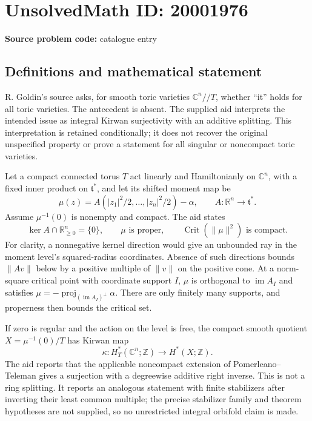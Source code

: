 \documentclass[11pt]{article}
\newcommand{\Z}{\mathbb{Z}}
\newcommand{\R}{\mathbb{R}}
\newcommand{\C}{\mathbb{C}}
\begin{document}
\section*{UnsolvedMath ID: 20001976}
\textbf{Source problem code:} catalogue entry
\subsection{Definitions and mathematical statement}
R. Goldin's source asks, for smooth toric varieties \(\C^n//T\), whether ``it'' holds for all toric varieties. The antecedent is absent. The supplied aid interprets the intended issue as integral Kirwan surjectivity with an additive splitting. This interpretation is retained conditionally; it does not recover the original unspecified property or prove a statement for all singular or noncompact toric varieties.

Let a compact connected torus \(T\) act linearly and Hamiltonianly on \(\C^n\), with a fixed inner product on \(\mathfrak t^*\), and let its shifted moment map be
\[
 \mu(z)=A(|z_1|^2/2,\ldots,|z_n|^2/2)-\alpha,
 \qquad A:\R^n\to\mathfrak t^*.
\]
Assume \(\mu^{-1}(0)\) is nonempty and compact. The aid states
\[
 \ker A\cap\R_{\geq0}^n=\{0\},\qquad
 \mu\text{ is proper},\qquad
 \operatorname{Crit}(\|\mu\|^2)\text{ is compact}.
\]
For clarity, a nonnegative kernel direction would give an unbounded ray in the moment level's squared-radius coordinates. Absence of such directions bounds \(\|Av\|\) below by a positive multiple of \(\|v\|\) on the positive cone. At a norm-square critical point with coordinate support \(I\), \(\mu\) is orthogonal to \(\operatorname{im}A_I\) and satisfies
\(\mu=-\operatorname{proj}_{(\operatorname{im}A_I)^\perp}\alpha\).
There are only finitely many supports, and properness then bounds the critical set.

If zero is regular and the action on the level is free, the compact smooth quotient \(X=\mu^{-1}(0)/T\) has Kirwan map
\[
 \kappa:H_T^*(\C^n;\Z)\longrightarrow H^*(X;\Z).
\]
The aid reports that the applicable noncompact extension of Pomerleano--Teleman gives a surjection with a degreewise additive right inverse. This is not a ring splitting. It reports an analogous statement with finite stabilizers after inverting their least common multiple; the precise stabilizer family and theorem hypotheses are not supplied, so no unrestricted integral orbifold claim is made.
\end{document}

